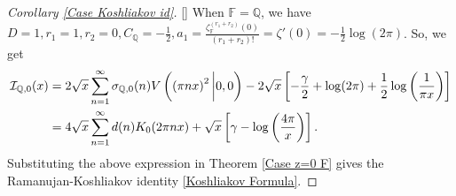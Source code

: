 \documentclass[12pt,reqno]{amsart}
\renewcommand{\(}{\left\(}
\renewcommand{\)}{\right\)}
\renewcommand{\[}{\left\[}
\renewcommand{\]}{\right\]}
\numberwithin{equation}{section}
\theoremstyle{plain}
\begin{document}
\begin{proof}[Corollary \rm{\ref{Case Koshliakov id}}][]
When $\mathbb{F} = \mathbb{Q}$, we have $D = 1, r_1 = 1, r_2 = 0, C_\mathbb{Q} = -\frac{1}{2}, a_1 =  \frac{\zeta^{(r_1+r_2)}_{\mathbb{F}}(0)}{(r_1+r_2)!} =  \zeta'(0) = -\frac{1}{2}\log(2\pi)$. So, we get
\begin{align*}
\mathcal{I}_{\mathbb{Q}, 0}(x) &= 2\sqrt{x}\sum_{n=1}^{\infty}\sigma_{\mathbb{Q}, 0}(n)V\left(\left(\pi n x\right)^2\bigg| 0, 0\right) - 2\sqrt{x}\left[-\frac{\gamma}{2} + \log(2\pi) + \frac{1}{2}\log\left(\frac{1}{\pi x}\right)\right] \notag \\
&= 4\sqrt{x}\sum_{n=1}^{\infty}d(n)K_0(2\pi n x) + \sqrt{x}\left[\gamma - \log\left(\frac{4\pi}{x}\right)\right].
\end{align*}
Substituting the above expression in Theorem \ref{Case z=0 F} gives the Ramanujan-Koshliakov identity \eqref{Koshliakov Formula}.
\end{proof}
\end{document}
